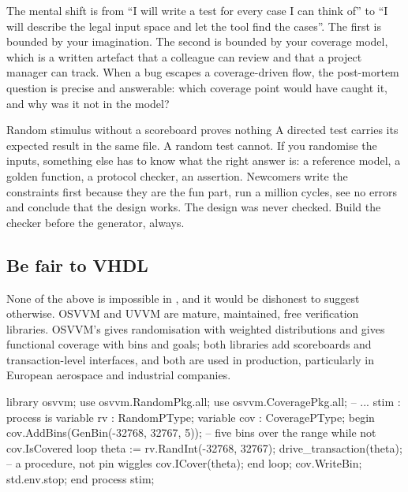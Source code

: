 The mental shift is from ``I will write a test for every case I can think of''
to ``I will describe the legal input space and let the tool find the cases''.
The first is bounded by your imagination. The second is bounded by your
coverage model, which is a written artefact that a colleague can review and
that a project manager can track. When a bug escapes a coverage-driven flow,
the post-mortem question is precise and answerable: which coverage point would
have caught it, and why was it not in the model?

\begin{gotcha}{Random stimulus without a scoreboard proves nothing}
A directed test carries its expected result in the same file. A random test
cannot. If you randomise the inputs, something else has to know what the right
answer is: a reference model, a golden function, a protocol checker, an
assertion. Newcomers write the constraints first because they are the fun part,
run a million cycles, see no errors and conclude that the design works. The
design was never checked. Build the checker before the generator, always.
\end{gotcha}

\subsection{Be fair to VHDL}

None of the above is impossible in \VHDL{}, and it would be dishonest to
suggest otherwise. OSVVM and UVVM are mature,
maintained, free \VHDL{} verification libraries. OSVVM's  gives
randomisation with weighted distributions and  gives
functional coverage with bins and goals; both libraries add scoreboards and
transaction-level interfaces, and both are used in production, particularly in
European aerospace and industrial companies.

\begin{vhdlcode}[caption={OSVVM: constrained random and coverage in VHDL (sketch)},label={lst:philosophy:osvvm}]
library osvvm;
use osvvm.RandomPkg.all;
use osvvm.CoveragePkg.all;
-- ...
stim : process is
  variable rv  : RandomPType;
  variable cov : CoveragePType;
begin
  cov.AddBins(GenBin(-32768, 32767, 5));   -- five bins over the range
  while not cov.IsCovered loop
    theta := rv.RandInt(-32768, 32767);
    drive_transaction(theta);              -- a procedure, not pin wiggles
    cov.ICover(theta);
  end loop;
  cov.WriteBin;
  std.env.stop;
end process stim;
\end{vhdlcode}

